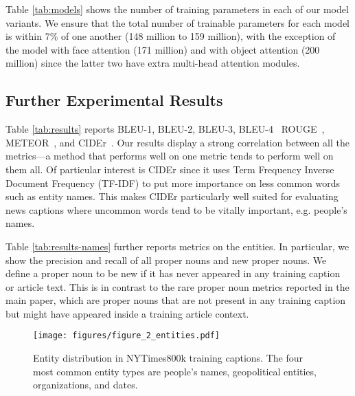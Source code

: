 Table \ref{tab:models} shows the number of training parameters in each of our
model variants. We ensure that the total number of trainable parameters for
each model is within 7\% of one another (148 million to 159 million), with the
exception of the model with face attention (171 million) and with object
attention (200 million) since the latter two have extra multi-head attention
modules.


\subsection{Further Experimental Results}

Table \ref{tab:results} reports BLEU-1, BLEU-2, BLEU-3,
BLEU-4~\cite{Papineni2002Bleu} ROUGE~\cite{Lin2004ROUGE},
METEOR~\cite{Denkowski2014Meteor}, and CIDEr~\cite{Vedantam2015CIDEr}. Our
results display a strong correlation between all the metrics---a method that
performs well on one metric tends to perform well on them all. Of particular
interest is CIDEr since it uses Term Frequency Inverse Document Frequency
(TF-IDF) to put more importance on less common words such as entity names. This
makes CIDEr particularly well suited for evaluating news captions where
uncommon words tend to be vitally important, e.g. people's names.

Table \ref{tab:results-names} further reports metrics on the entities. In
particular, we show the precision and recall of all proper nouns and new proper
nouns. We define a proper noun to be new if it has never appeared in any
training caption or article text. This is in contrast to the rare proper noun
metrics reported in the main paper, which are proper nouns that are not present
in any training caption but might have appeared inside a training article
context.



\begin{figure}[t]
   \begin{center}
      \texttt{[image: figures/figure\_2\_entities.pdf]}
   \end{center}
   \caption{Entity distribution in NYTimes800k training captions. The four
      most common entity types are people's names, geopolitical
      entities, organizations, and dates.}
   \label{fig:entities}
\end{figure}






